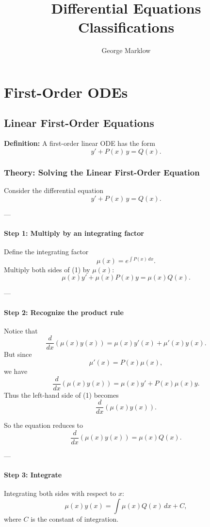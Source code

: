 \documentclass[12pt]{book}
\begin{document}
\frontmatter
\title{Differential Equations Classifications}
\author{George Marklow}
\maketitle
\tableofcontents

\mainmatter

\part{First-Order ODEs}

\chapter{Linear First-Order Equations}
\textbf{Definition:} A first-order linear ODE has the form
\[
y' + P(x)\,y = Q(x).
\]

\section*{Theory: Solving the Linear First-Order Equation}

Consider the differential equation
\[
y' + P(x)\,y = Q(x). \tag{1}
\]

---

\subsection*{Step 1: Multiply by an integrating factor}
Define the integrating factor
\[
\mu(x) = e^{\int P(x)\,dx}.
\]
Multiply both sides of (1) by $\mu(x)$:
\[
\mu(x) y' + \mu(x) P(x) y = \mu(x) Q(x).
\]

---

\subsection*{Step 2: Recognize the product rule}
Notice that
\[
\frac{d}{dx}\!\left(\mu(x) y(x)\right) 
= \mu(x) y'(x) + \mu'(x) y(x).
\]
But since
\[
\mu'(x) = P(x)\mu(x),
\]
we have
\[
\frac{d}{dx}\!\left(\mu(x) y(x)\right) 
= \mu(x) y' + P(x)\mu(x) y.
\]
Thus the left-hand side of (1) becomes
\[
\frac{d}{dx}\!\left(\mu(x) y(x)\right).
\]

So the equation reduces to
\[
\frac{d}{dx}\!\left(\mu(x) y(x)\right) = \mu(x) Q(x). \tag{2}
\]

---

\subsection*{Step 3: Integrate}
Integrating both sides with respect to $x$:
\[
\mu(x) y(x) = \int \mu(x) Q(x)\, dx + C,
\]
where $C$ is the constant of integration.
\end{document}
